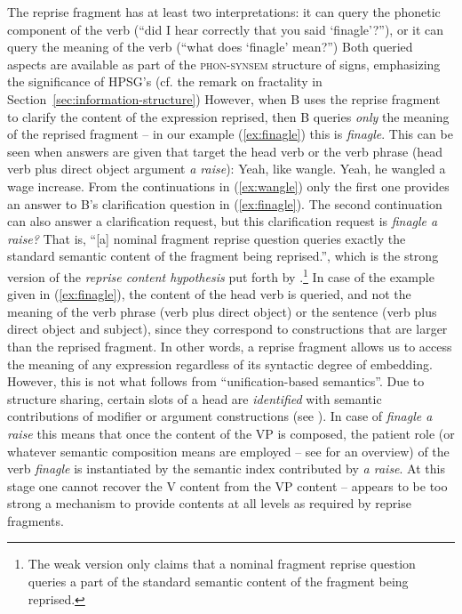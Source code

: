 \documentclass[output=paper]{langsci/langscibook}
\begin{document}
The reprise fragment has at least two interpretations: it can query the phonetic component of the verb (\enquote{did I hear correctly that you said \enquote{finagle}?}), or it can query the meaning of the verb (\enquote{what does \enquote{finagle} mean?})
%
Both queried aspects are available as part of the \textsc{phon-synsem} structure of signs, emphasizing the significance of HPSG's   (cf. the remark on fractality in Section~\ref{sec:information-structure})
%
However, when B uses the reprise fragment to clarify the content of the expression reprised, then B queries \emph{only} the meaning of the reprised fragment \citep{Purver:Ginzburg:2004,Ginzburg:Purver:2012} -- in our example (\ref{ex:finagle}) this is \textit{finagle}.
%
This can be seen when answers are given that target the head verb or the verb phrase (head verb plus direct object argument \textit{a raise}):
%
\ea \label{ex:wangle}
 \ea Yeah, like wangle.
 \ex Yeah, he wangled a wage increase.
 \z 
\z
%
From the continuations in (\ref{ex:wangle}) only the first one provides an answer to B's clarification question in (\ref{ex:finagle}).
%
The second continuation can also answer a clarification request, but this clarification request is \textit{finagle a raise?}
%
That is, \enquote{[a] nominal fragment reprise question queries exactly the standard semantic content of the fragment being reprised.}, which is the strong version of the \emph{reprise content hypothesis}  put forth by \citet[p.~288]{Purver:Ginzburg:2004}.\footnote{The weak version \citep[p.~287]{Purver:Ginzburg:2004} only claims that a nominal fragment reprise question queries a part of the standard semantic content of the fragment being reprised.}
%
In case of the example given in (\ref{ex:finagle}), the content of the head verb is queried, and not the meaning of the verb phrase (verb plus direct object) or the sentence (verb plus direct object and subject), since they correspond to constructions that are larger than the reprised fragment. 
%
In other words, a reprise fragment allows us to access the meaning of any expression regardless of its syntactic degree of embedding. 
%
However, this is not what follows from \enquote{unification-based semantics}.
%
Due to structure sharing, certain slots of a head are \emph{identified} with semantic contributions of modifier or argument constructions (see  ).
%
In case of \textit{finagle a raise} this means that once the content of the VP is composed, the patient role (or whatever semantic composition means are employed -- see  for an overview) of the verb \textit{finagle} is instantiated by the semantic index contributed by \textit{a raise}.
%
At this stage one cannot recover the V content from the VP content --  appears to be too strong a mechanism to provide contents at all levels as required by reprise fragments. 
  
\end{document}
